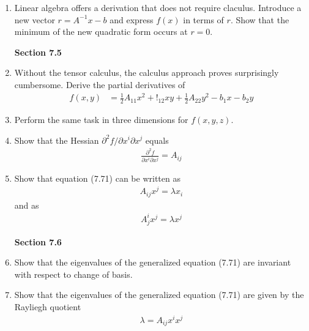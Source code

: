 \documentclass[12pt,a4paper]{report}
\begin{document}
\begin{enumerate}[label=\textbf{\arabic*.}]
\item Linear algebra offers a derivation that does not require claculus.  Introduce a new vector $r = A^{-1}x-b$ and express $f(x)$ in terms of $r$.  Show that the minimum of the new quadratic form occurs at $r=0$.

\textbf{Section 7.5}
\item Without the tensor calculus, the calculus approach proves surprisingly cumbersome.  Derive the partial derivatives of 
\begin{align*}
	f(x,y) &= \frac{1}{2}A_{11}x^2+!_{12}xy+\frac{1}{2}A_{22}y^2 -b_1x-b_2y
\end{align*}

\item Perform the same task in three dimensions for $f(x,y,z)$.

\item Show that the Hessian $\partial^2 f/\partial x^i\partial x^j$ equals 
\begin{align*}
	\frac{\partial^2 f}{\partial x^i\partial x^j} = A_{ij}
\end{align*}

\item Show that equation (7.71) can be written as 
\begin{align*}
	A_{ij}x^j=\lambda x_i
\end{align*}and as
\begin{align*}
	A^i_j x^j = \lambda x^j
\end{align*}

\textbf{Section 7.6}
\item Show that the eigenvalues of the generalized equation (7.71) are invariant with respect to change of basis.

\item Show that the eigenvalues of the generalized equation (7.71) are given by the Rayliegh quotient
\begin{align*}
	\lambda = A_{ij}x^ix^j
\end{align*}

\end{enumerate}
\end{document}
